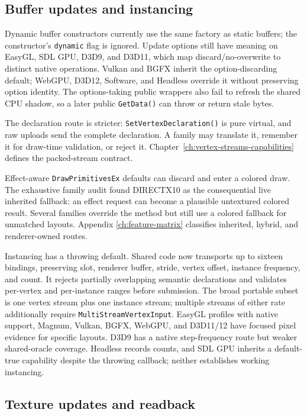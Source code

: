 \subsection{Buffer updates and instancing}

Dynamic buffer constructors currently use the same factory as static buffers; the constructor's
\texttt{dynamic} flag is ignored. Update options still have meaning on EasyGL, SDL GPU, D3D9,
and D3D11, which map discard/no-overwrite to distinct native operations. Vulkan and BGFX inherit
the option-discarding default; WebGPU, D3D12, Software, and Headless override it without
preserving option identity. The options-taking public wrappers also fail to refresh the shared
CPU shadow, so a later public \texttt{GetData()} can throw or return stale bytes.

The declaration route is stricter: \texttt{SetVertexDeclaration()} is pure virtual, and raw
uploads send the complete declaration. A family may translate it, remember it for draw-time
validation, or reject it. Chapter~\ref{ch:vertex-streams-capabilities} defines the packed-stream
contract.

\label{sec:drawex-instancing-matrix}
Effect-aware \texttt{DrawPrimitivesEx} defaults can discard  and enter a
colored draw. The exhaustive family audit found DIRECTX10 as the consequential live inherited
fallback: an effect request can become a plausible untextured colored result. Several families
override the method but still use a colored fallback for unmatched layouts. Appendix
\ref{ch:feature-matrix} classifies inherited, hybrid, and renderer-owned routes.

Instancing has a throwing default. Shared code now transports up to sixteen bindings, preserving
slot, renderer buffer, stride, vertex offset, instance frequency, and count. It rejects partially
overlapping semantic declarations and validates per-vertex and per-instance ranges before
submission. The broad portable subset is one vertex stream plus one instance stream; multiple
streams of either rate additionally require \texttt{MultiStreamVertexInput}. EasyGL profiles
with native support, Magnum, Vulkan, BGFX, WebGPU, and D3D11/12 have focused pixel evidence for
specific layouts. D3D9 has a native step-frequency route but weaker shared-oracle coverage.
Headless records counts, and SDL GPU inherits a default-true capability despite the throwing
callback; neither establishes working instancing.

\subsection{Texture updates and readback}
\label{sec:texture2d-update-matrix}

